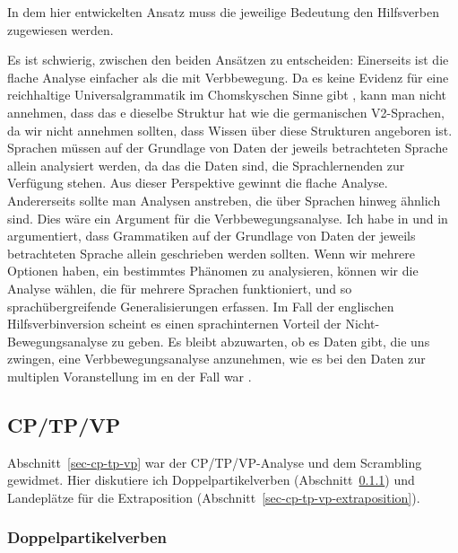 \noindent
In dem hier entwickelten Ansatz muss die jeweilige Bedeutung den Hilfsverben zugewiesen werden.

Es ist schwierig, zwischen den beiden Ansätzen zu entscheiden: Einerseits ist die flache Analyse einfacher
als die mit Verbbewegung. Da es keine Evidenz für eine reichhaltige Universalgrammatik im
Chomskyschen Sinne gibt \citep*{HCF2002a}, kann man nicht annehmen, dass das e dieselbe Struktur hat wie die
germanischen V2-Sprachen, da wir nicht annehmen sollten, dass Wissen über diese Strukturen
angeboren ist. Sprachen müssen auf der Grundlage von Daten der jeweils betrachteten Sprache
allein analysiert werden, da das die Daten sind, die Sprachlernenden zur Verfügung stehen. Aus dieser Perspektive gewinnt die flache
Analyse. Andererseits sollte man Analysen anstreben, die über Sprachen hinweg ähnlich sind. Dies
wäre ein Argument für die Verbbewegungsanalyse. Ich habe in  und in
 argumentiert, dass Grammatiken auf der Grundlage von Daten der jeweils betrachteten Sprache
allein geschrieben werden sollten. Wenn wir mehrere Optionen haben, ein bestimmtes Phänomen zu analysieren, können wir die
Analyse wählen, die für mehrere Sprachen funktioniert, und so sprachübergreifende Generalisierungen erfassen. Im
Fall der englischen Hilfsverbinversion scheint es einen sprachinternen Vorteil der
Nicht-Bewegungsanalyse zu geben. Es bleibt abzuwarten, ob es Daten gibt, die uns zwingen, eine Verbbewegungsanalyse
anzunehmen, wie es bei den Daten zur multiplen Voranstellung im en der Fall war \citep{Mueller2005d,MuellerGS}.

\subsection{CP/TP/VP}
\label{sec-cp-tp-vp-and-verb-last-non-movement}

Abschnitt~\ref{sec-cp-tp-vp} war der CP/TP/VP-Analyse und dem
Scrambling gewidmet. Hier diskutiere ich Doppelpartikelverben (Abschnitt~\ref{sec-cp-tp-vp-double-particles}) und Landeplätze für die Extraposition (Abschnitt~\ref{sec-cp-tp-vp-extraposition}).

\subsubsection{Doppelpartikelverben}
\label{sec-cp-tp-vp-double-particles}


